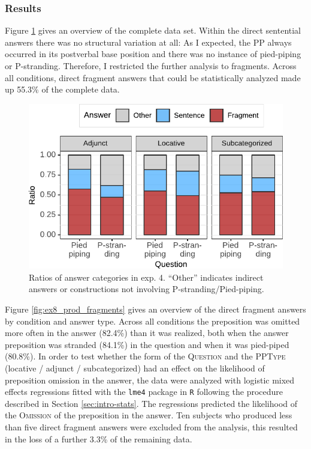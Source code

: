 \subsubsection{Results}
Figure \ref{fig:ex8_prod_relfrag} gives an overview of the complete data set. Within the direct sentential answers there was no structural variation at all: As I expected, the PP always occurred in its postverbal base position and there was no instance of pied-piping or P-stranding. Therefore, I restricted the further analysis to fragments. Across all conditions, direct fragment answers that could be statistically analyzed made up 55.3\% of the complete data.

\begin{figure}
\includegraphics[scale=1]{figures/ex8_prod_answers}
 \caption{Ratios of answer categories in exp. 4. ``Other'' indicates indirect answers or constructions not involving P-stranding/Pied-piping\label{fig:ex8_prod_relfrag}.}
\end{figure}

Figure \ref{fig:ex8_prod_fragments} gives an overview of the direct fragment answers by condition and answer type. Across all conditions the preposition was omitted more often in the answer (82.4\%) than it was realized, both when the answer preposition was stranded (84.1\%) in the question and when it was pied-piped (80.8\%). In order to test whether the form of the \textsc{Question} and the \textsc{PPType} (locative / adjunct / subcategorized) had an effect on the likelihood of preposition omission in the answer, the data were analyzed with logistic mixed effects regressions fitted with the \texttt{lme4} \citep{bates.etal2015} package in \texttt{R} following the procedure described in Section \ref{sec:intro-stats}. The regressions predicted the likelihood of the \textsc{Omission} of the preposition in the answer. Ten subjects who produced less than five direct fragment answers were excluded from the analysis, this resulted in the loss of a further 3.3\% of the remaining data.

